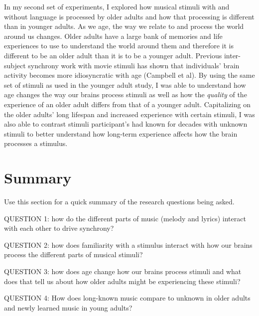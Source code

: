 In my second set of experiments, I explored how musical stimuli with and without language is processed by older adults and how that processing is different than in younger adults.
As we age, the way we relate to and process the world around us changes. 
Older adults have a large bank of memories and life experiences to use to understand the world around them and therefore it is different to be an older adult than it is to be a younger adult. 
Previous inter-subject synchrony work with movie stimuli has shown that individuals' brain activity becomes more idiosyncratic with age (Campbell et al).
By using the same set of stimuli as used in the younger adult study, I was able to understand how age changes the way our brains process stimuli as well as how the \textit{quality} of the experience of an older adult differs from that of a younger adult.
Capitalizing on the older adults' long lifespan and increased experience with certain stimuli, I was also able to contrast stimuli participant's had known for decades with unknown stimuli to better understand how long-term experience affects how the brain processes a stimulus.

\section{Summary}
Use this section for a quick summary of the research questions being asked.

QUESTION 1: how do the different parts of music (melody and lyrics) interact with each other to drive synchrony?

QUESTION 2: how does familiarity with a stimulus interact with how our brains process the different parts of musical stimuli?

QUESTION 3: how does age change how our brains process stimuli and what does that tell us about how older adults might be experiencing these stimuli?

QUESTION 4: How does long-known music compare to unknown in older adults and newly learned music in young adults?


